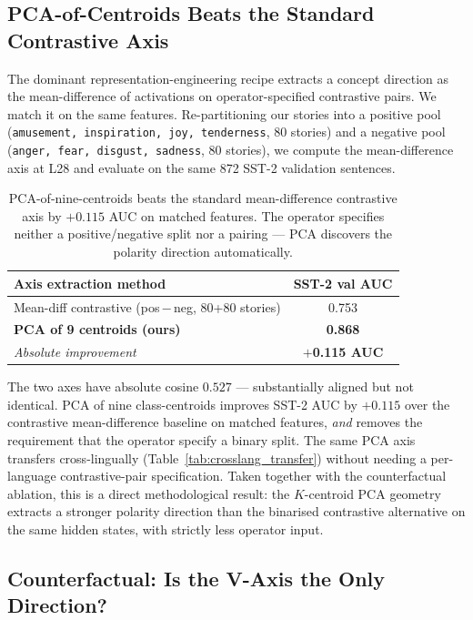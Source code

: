 \subsection{PCA-of-Centroids Beats the Standard Contrastive Axis}
\label{sec:contrastive}

The dominant representation-engineering recipe
\cite{zou2023representation, rimsky2024steering, arditi2024refusal}
extracts a concept direction as the mean-difference of activations on
operator-specified contrastive pairs. We match it on the same features.
Re-partitioning our stories into a positive pool (\texttt{amusement,
inspiration, joy, tenderness}, 80 stories) and a negative pool
(\texttt{anger, fear, disgust, sadness}, 80 stories), we compute the
mean-difference axis at L28 and evaluate on the same 872 SST-2
validation sentences.

\begin{table}[h]
\centering
\caption{PCA-of-nine-centroids beats the standard mean-difference
contrastive axis by $+0.115$ AUC on matched features. The operator
specifies neither a positive/negative split nor a pairing --- PCA
discovers the polarity direction automatically.}
\label{tab:contrastive}
\begin{tabular}{lc}
\toprule
Axis extraction method & SST-2 val AUC \\
\midrule
Mean-diff contrastive (pos\,$-$\,neg, 80+80 stories) & 0.753 \\
\rowcolor{blond}
\textbf{PCA of 9 centroids (ours)} & \textbf{0.868} \\
\midrule
\emph{Absolute improvement} & \textbf{$+$0.115 AUC} \\
\bottomrule
\end{tabular}
\end{table}

The two axes have absolute cosine $0.527$ --- substantially aligned but
not identical. PCA of nine class-centroids improves SST-2 AUC by
$+0.115$ over the contrastive mean-difference baseline on matched
features, \emph{and} removes the requirement that the operator specify
a binary split. The same PCA axis transfers cross-lingually
(Table~\ref{tab:crosslang_transfer}) without needing a per-language
contrastive-pair specification. Taken together with the counterfactual
ablation, this is a direct methodological result: the $K$-centroid PCA
geometry extracts a stronger polarity direction than the binarised
contrastive alternative on the same hidden states, with strictly less
operator input.

\subsection{Counterfactual: Is the V-Axis the Only Direction?}
\label{sec:counterfactual}

